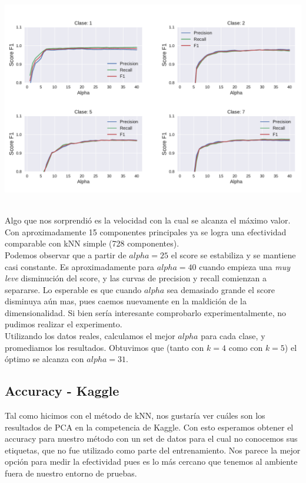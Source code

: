 {\centering
    \includegraphics[scale=0.65]{informe/imagenes/pca/variacionAlphaClases1257KFijo.pdf} \\
}
$ $\newline

Algo que nos sorprendió es la velocidad con la cual se alcanza el máximo valor. Con aproximadamente 15 componentes principales ya se logra una efectividad comparable con kNN simple (728 componentes). \\

Podemos observar que a partir de $alpha=25$ el score se estabiliza y se mantiene casi constante. Es aproximadamente para $alpha=40$ cuando empieza una \textit{muy leve} disminución del score, y las curvas de precision y recall comienzan a separarse. Lo esperable es que cuando $alpha$ sea demasiado grande el score disminuya aún mas, pues caemos nuevamente en la maldición de la dimensionalidad. Si bien sería interesante comprobarlo experimentalmente, no pudimos realizar el experimento. \\

Utilizando los datos reales, calculamos el mejor $alpha$ para cada clase, y promediamos los resultados. Obtuvimos que (tanto con $k=4$ como con $k=5$) el óptimo se alcanza con $alpha=31$. \\


\subsection{Accuracy - Kaggle}

Tal como hicimos con el método de kNN, nos gustaría ver cuáles son los resultados de PCA en la competencia de Kaggle. Con esto esperamos obtener el accuracy para nuestro método con un set de datos para el cual no conocemos sus etiquetas, que no fue utilizado como parte del entrenamiento. Nos parece la mejor opción para medir la efectividad pues es lo más cercano que tenemos al ambiente fuera de nuestro entorno de pruebas. \\

